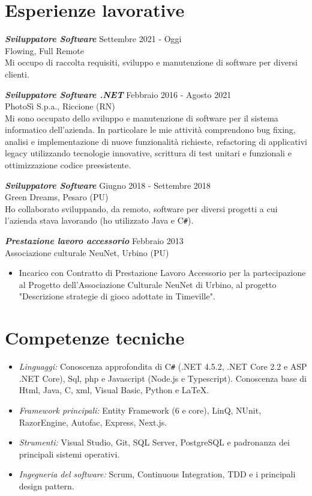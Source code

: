\documentclass[margin, 10pt]{res} %
\begin{document}
\begin{resume}
\section{Esperienze lavorative}

{\sl \textbf{Sviluppatore Software}} \hfill Settembre 2021 - Oggi \\
Flowing, Full Remote \\
Mi occupo di raccolta requisiti, sviluppo e manutenzione di software per diversi clienti.

{\sl \textbf{Sviluppatore Software .NET}} \hfill Febbraio 2016 - Agosto 2021 \\
PhotoS\`i  S.p.a., Riccione (RN) \\
Mi sono occupato dello sviluppo e manutenzione di software per il sistema informatico dell'azienda. In particolare le mie attivit\`a comprendono bug fixing, analisi e implementazione di nuove funzionalit\`a richieste, refactoring di applicativi legacy utilizzando tecnologie innovative, scrittura di test unitari e funzionali e ottimizzazione codice preesistente.

{\sl \textbf{Sviluppatore Software}} \hfill Giugno 2018 - Settembre 2018 \\
Green Dreams, Pesaro (PU) \\
Ho collaborato sviluppando, da remoto, software per diversi progetti a cui l'azienda stava lavorando (ho utilizzato Java e C\texttt{\#}).

{\sl \textbf{Prestazione lavoro accessorio}} \hfill Febbraio 2013 \\
Associazione culturale NeuNet, Urbino (PU) 
\begin{itemize} %
\item Incarico con Contratto di Prestazione Lavoro Accessorio per la partecipazione al Progetto dell'Associazione Culturale NeuNet di Urbino, al progetto "Descrizione strategie di gioco adottate in Timeville". \\
\end{itemize}


\section{Competenze tecniche}

\begin{itemize}

\item {\sl Linguaggi:} Conoscenza approfondita di C\texttt{\#} (.NET 4.5.2, .NET Core 2.2 e ASP .NET Core), Sql, php e Javascript (Node.js e Typescript). Conoscenza base di Html, Java, C, xml, Visual Basic, Python e \LaTeX.
\item {\sl Framework principali:} Entity Framework (6 e core), LinQ, NUnit, RazorEngine, Autofac, Express, Next.js.
\item {\sl Strumenti:} Visual Studio, Git, SQL Server, PostgreSQL e padronanza dei principali sistemi operativi.
\item {\sl Ingegneria del software:} Scrum, Continuous Integration, TDD e i principali design pattern.


\end{itemize}
\end{resume}
\end{document}
